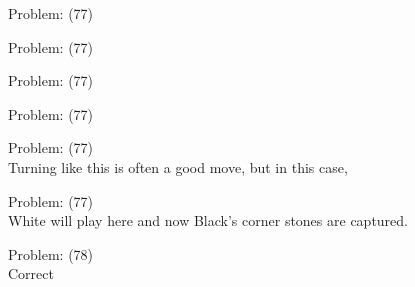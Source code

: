 \documentclass[11pt]{article}
\begin{document}
\begin{minipage}[t]{0.5\textwidth}
  {\centering
  
  Problem: (77)\\
  
  }
\end{minipage}
\begin{minipage}[t]{0.5\textwidth}
  {\centering
  
  Problem: (77)\\
  
  }
\end{minipage}
\begin{minipage}[t]{0.5\textwidth}
  {\centering
  
  Problem: (77)\\
  
  }
\end{minipage}
\begin{minipage}[t]{0.5\textwidth}
  {\centering
  
  Problem: (77)\\
  
  }
\end{minipage}
\begin{minipage}[t]{0.5\textwidth}
  {\centering
  
  Problem: (77)\\
  Turning like this is often a good move, but in this case,\\
  }
\end{minipage}
\begin{minipage}[t]{0.5\textwidth}
  {\centering
  
  Problem: (77)\\
  White will play here and now Black's corner stones are captured.\\
  }
\end{minipage}
\begin{minipage}[t]{0.5\textwidth}
  {\centering
  
  Problem: (78)\\
  Correct\\
  }
\end{minipage}
\end{document}
